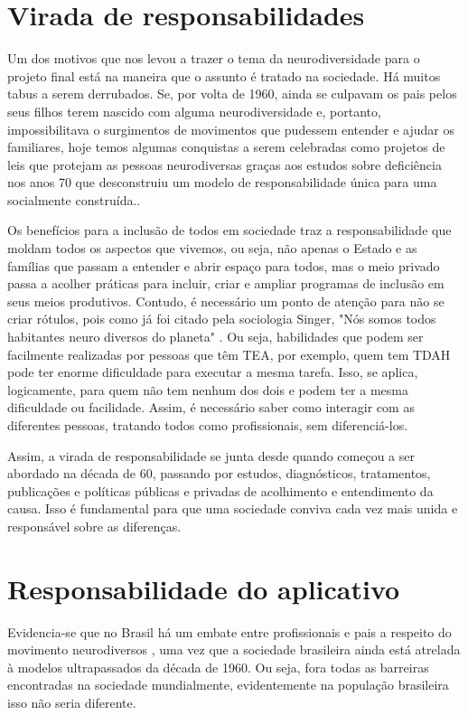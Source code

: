 \section{Virada de responsabilidades}
Um dos motivos que nos levou a trazer o tema da neurodiversidade para o projeto final está na maneira que o assunto é tratado na sociedade. Há muitos tabus a serem derrubados. Se, por volta de 1960, ainda se culpavam os pais pelos seus filhos terem nascido com alguma neurodiversidade e, portanto, impossibilitava o surgimentos de movimentos que pudessem entender e ajudar os familiares, hoje temos algumas conquistas a serem celebradas como projetos de leis que protejam as pessoas neurodiversas graças aos estudos sobre deficiência nos anos 70 que desconstruiu um modelo de responsabilidade única para uma socialmente construída.\cite{ortega2008}. 

Os benefícios para a inclusão de todos em sociedade traz a responsabilidade que moldam todos os aspectos que vivemos, ou seja, não apenas o Estado e as famílias que passam a entender e abrir espaço para todos, mas o meio privado passa a acolher práticas para incluir, criar e ampliar programas de inclusão em seus meios produtivos. Contudo, é necessário um ponto de atenção para não se criar rótulos, pois como já foi citado pela sociologia Singer, "Nós somos todos habitantes neuro diversos do planeta" \cite{judysinger}. Ou seja, habilidades que podem ser facilmente realizadas por pessoas que têm TEA, por exemplo, quem tem TDAH pode ter enorme dificuldade para executar a mesma tarefa. Isso, se aplica, logicamente, para quem não tem nenhum dos dois e podem ter a mesma dificuldade ou facilidade. Assim, é necessário saber como interagir com as diferentes pessoas, tratando todos como profissionais, sem diferenciá-los.

Assim, a virada de responsabilidade se junta desde quando começou a ser abordado na década de 60, passando por estudos, diagnósticos, tratamentos, publicações e políticas públicas e privadas de acolhimento e entendimento da causa. Isso é fundamental para que uma sociedade conviva cada vez mais unida e responsável sobre as diferenças. 


\section{Responsabilidade do aplicativo}
Evidencia-se que no Brasil há um embate entre profissionais e pais a respeito do movimento neurodiversos \cite{rios}, uma vez que a sociedade brasileira ainda está atrelada à modelos ultrapassados da década de 1960. Ou seja, fora todas as barreiras encontradas na sociedade mundialmente, evidentemente na população brasileira isso não seria diferente.

